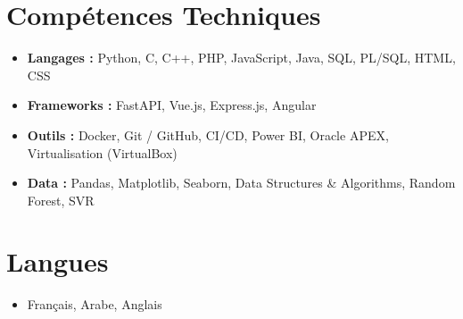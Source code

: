 \documentclass[a4paper,11pt]{article}
\begin{document}
\section*{Compétences Techniques}
\begin{itemize}[leftmargin=*, noitemsep]
    \item \textbf{Langages :} Python, C, C++, PHP, JavaScript, Java, SQL, PL/SQL, HTML, CSS
    \item \textbf{Frameworks :} FastAPI, Vue.js, Express.js, Angular
    \item \textbf{Outils :} Docker, Git / GitHub, CI/CD, Power BI, Oracle APEX, Virtualisation (VirtualBox)
    \item \textbf{Data :} Pandas, Matplotlib, Seaborn, Data Structures \& Algorithms, Random Forest, SVR
\end{itemize}

\section*{Langues}
\begin{itemize}[leftmargin=*, noitemsep]
    \item Français, Arabe, Anglais
\end{itemize}
\end{document}
